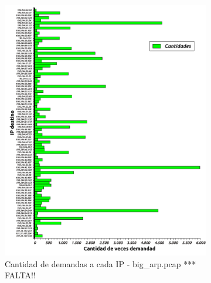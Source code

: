 \begin{figure}[H]
        \begin{subfigure}[H]{0.5\textwidth}
                \centering
                \includegraphics[width=1\textwidth]{graficos/cantidadConsultasCasaJulian.pdf}
                \caption{Cantidad de demandas a cada IP - big\_arp.pcap *** FALTA!!}
                \label{fig:hist3}
        \end{subfigure}
        \begin{subfigure}[H]{0.5\textwidth}
                \centering

\end{subfigure}
\end{figure}
